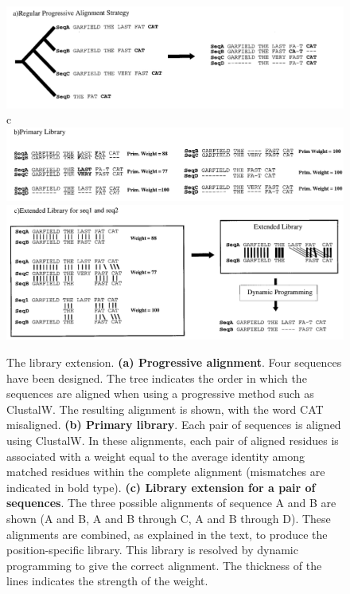 \begin{figure}[H]
\centering
\includegraphics[width=0.8\linewidth]{2a.png}
c\includegraphics[width=0.8\linewidth]{2b.png}
\includegraphics[width=0.8\linewidth]{2c.png}
\caption{The library extension. \textbf{(a) Progressive alignment}. Four sequences have been designed. The tree indicates the order in which the sequences are aligned when using a progressive method such as ClustalW. The resulting alignment is shown, with the word CAT misaligned. \textbf{(b) Primary library}. Each pair of sequences is aligned using ClustalW. In these alignments, each pair of aligned residues is associated with a weight equal to the average identity among matched residues within the complete alignment (mismatches are indicated in bold type). \textbf{(c) Library extension for a pair of sequences}. The three possible alignments of sequence A and B are shown (A and B, A and B through C, A and B through D). These alignments are combined, as explained in the text, to produce the position-specific library. This library is resolved by dynamic programming to give the correct alignment. The thickness of the lines indicates the strength of the weight.}
\label{fig:2}
\end{figure}


